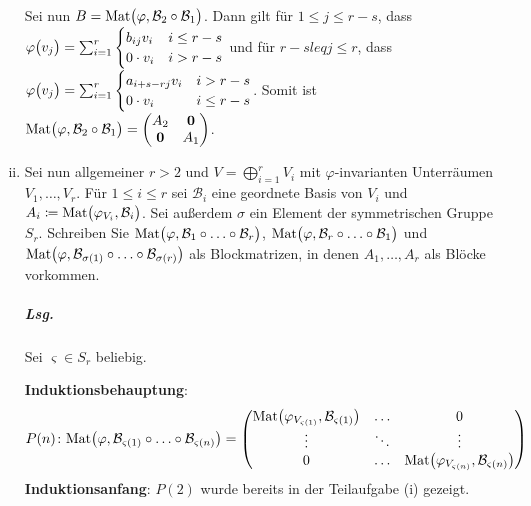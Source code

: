 \documentclass{scrreprt}
\newcommand\Mat{\text{Mat}}
\begin{document}
\begin{enumerate}[(i)]
  Sei nun $B = \Mat\qty\big(\varphi, \mathcal{B}_2 \circ \mathcal{B}_1)$.
  Dann gilt für $1 \leq j \leq r - s$, dass
  $\varphi\qty\big(v_j) = \sum_{i = 1}^r \begin{cases}
    b_{ij}v_i & i \leq r - s \\
    0 \cdot v_i & i > r - s
  \end{cases}$ und für $r - s leq j \leq r$, dass
  $\varphi\qty\big(v_j) = \sum_{i = 1}^r \begin{cases}
    a_{i + s - rj}v_i & i > r - s \\
    0 \cdot v_i & i \leq r - s
  \end{cases}$.
  Somit ist $\Mat\qty\big(\varphi, \mathcal{B}_2 \circ \mathcal{B}_1) =
  \begin{pmatrix}
    A_2 & \textbf{0} \\
    \textbf{0} & A_1 \\
  \end{pmatrix}$.

\newpage
\item Sei nun allgemeiner $r > 2$ und $V = \bigoplus_{i = 1}^r V_i$ mit
  $\varphi$-invarianten Unterräumen $V_1, \ldots, V_r$.
  Für $1 \leq i \leq r$ sei $\mathcal{B}_i$ eine geordnete Basis von $V_i$
  und $A_i \coloneqq \Mat\qty\big(\varphi_{V_i}, \mathcal{B}_i)$.
  Sei außerdem $\sigma$ ein Element der symmetrischen Gruppe $S_r$.
  Schreiben Sie
  $\Mat\qty\big(\varphi, \mathcal{B}_1 \circ \ldots \circ \mathcal{B}_r)$,
  $\Mat\qty\big(\varphi, \mathcal{B}_r \circ \ldots \circ \mathcal{B}_1)$ und
  $\Mat\qty\big(
    \varphi,
    \mathcal{B}_{\sigma(1)} \circ \ldots \circ \mathcal{B}_{\sigma(r)}
  )$ als Blockmatrizen, in denen $A_1, \ldots, A_r$ als Blöcke vorkommen.

  \subparagraph{Lsg.} Sei $\varsigma \in S_r$ beliebig.

  \textbf{Induktionsbehauptung}:
  \[
    P(n) \colon \Mat\qty\big(
      \varphi,
      \mathcal{B}_{\varsigma(1)} \circ \ldots \circ \mathcal{B}_{\varsigma(n)}
    ) = \begin{pmatrix}
      \Mat\qty\big(\varphi_{V_{\varsigma(1)}}, \mathcal{B}_{\varsigma(1)}) & \ldots & 0 \\
      \vdots & \ddots & \vdots \\
      0 & \ldots & \Mat\qty\big(\varphi_{V_{\varsigma(n)}}, \mathcal{B}_{\varsigma(n)}) \\
    \end{pmatrix}
  \]
  \textbf{Induktionsanfang}: $P(2)$ wurde bereits in der Teilaufgabe (i) gezeigt.


\end{enumerate}
\end{document}
